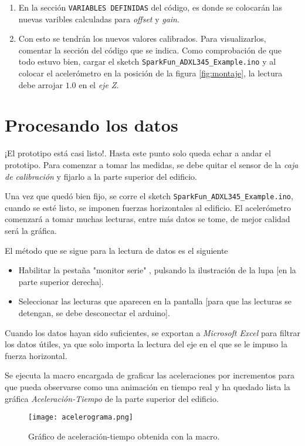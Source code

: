 \documentclass[10pt, a4paper, twocolumn]{article} %
\begin{document}
\begin{enumerate}
\item En la sección \texttt{VARIABLES DEFINIDAS} del código, es donde se colocarán las nuevas varibles calculadas para \textit{offset} y \textit{gain}.
\item Con esto se tendrán los nuevos valores calibrados. Para visualizarlos, comentar la sección del código que se indica. Como comprobación de que todo estuvo bien, cargar el sketch \texttt{SparkFun\_ADXL345\_Example.ino} y al colocar el acelerómetro en la posición de la figura \ref{fig:montaje}, la lectura debe arrojar $1.0$ en el \textit{eje Z}.

\end{enumerate}

\section{Procesando los datos}

¡El prototipo está casi listo!. Hasta este punto solo queda echar a andar el prototipo. Para comenzar a tomar las medidas, se debe quitar el sensor de la \textit{caja de calibración} y fijarlo a la parte superior del edificio.

Una vez que quedó bien fijo, se corre el sketch \texttt{SparkFun\_ADXL345\_Example.ino}, cuando se esté listo, se imponen fuerzas horizontales al edificio. El acelerómetro comenzará a tomar muchas lecturas, entre más datos se tome, de mejor calidad será la gráfica.

El m\'etodo que se sigue para la lectura de datos es el siguiente
\begin{itemize}
\item Habilitar la pestaña "monitor serie" , pulsando la ilustraci\'on de la lupa [en la parte superior derecha].
\item Seleccionar las lecturas que aparecen en la pantalla [para que las lecturas se detengan, se debe desconectar el arduino].
\end{itemize}

Cuando los datos hayan sido suficientes, se exportan a \textit{Microsoft Excel} para filtrar los datos útiles, ya que solo importa la lectura del eje en el que se le impuso la fuerza horizontal.

Se ejecuta la macro encargada de graficar las aceleraciones por incrementos para que pueda observarse como una animación en tiempo real y ha quedado lista la gráfica \textit{Aceleración-Tiempo} de la parte superior del edificio.

\begin{figure}[htbp]
	\begin{center}
		\texttt{[image: acelerograma.png]} %
		\caption{Gráfico de aceleración-tiempo obtenida con la macro.} %
	\end{center}
\end{figure}
\end{document}
